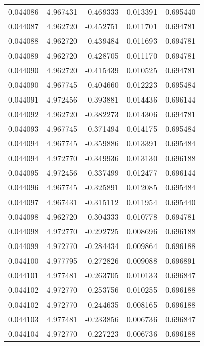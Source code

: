 \begin{tabular}{lrrrr}
0.044086    &  4.967431 & -0.469333 &  0.013391 &             0.695440 \\
0.044087    &  4.962720 & -0.452751 &  0.011701 &             0.694781 \\
0.044088    &  4.962720 & -0.439484 &  0.011693 &             0.694781 \\
0.044089    &  4.962720 & -0.428705 &  0.011170 &             0.694781 \\
0.044090    &  4.962720 & -0.415439 &  0.010525 &             0.694781 \\
0.044090    &  4.967745 & -0.404660 &  0.012223 &             0.695484 \\
0.044091    &  4.972456 & -0.393881 &  0.014436 &             0.696144 \\
0.044092    &  4.962720 & -0.382273 &  0.014306 &             0.694781 \\
0.044093    &  4.967745 & -0.371494 &  0.014175 &             0.695484 \\
0.044094    &  4.967745 & -0.359886 &  0.013391 &             0.695484 \\
0.044094    &  4.972770 & -0.349936 &  0.013130 &             0.696188 \\
0.044095    &  4.972456 & -0.337499 &  0.012477 &             0.696144 \\
0.044096    &  4.967745 & -0.325891 &  0.012085 &             0.695484 \\
0.044097    &  4.967431 & -0.315112 &  0.011954 &             0.695440 \\
0.044098    &  4.962720 & -0.304333 &  0.010778 &             0.694781 \\
0.044098    &  4.972770 & -0.292725 &  0.008696 &             0.696188 \\
0.044099    &  4.972770 & -0.284434 &  0.009864 &             0.696188 \\
0.044100    &  4.977795 & -0.272826 &  0.009088 &             0.696891 \\
0.044101    &  4.977481 & -0.263705 &  0.010133 &             0.696847 \\
0.044102    &  4.972770 & -0.253756 &  0.010255 &             0.696188 \\
0.044102    &  4.972770 & -0.244635 &  0.008165 &             0.696188 \\
0.044103    &  4.977481 & -0.233856 &  0.006736 &             0.696847 \\
0.044104    &  4.972770 & -0.227223 &  0.006736 &             0.696188 \\

\end{tabular}
